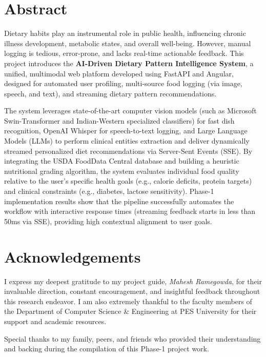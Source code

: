 \documentclass[12pt,a4paper,oneside]{report}
\begin{document}
\newpage
{}
\section*{Abstract}
Dietary habits play an instrumental role in public health, influencing chronic illness development, metabolic states, and overall well-being. However, manual logging is tedious, error-prone, and lacks real-time actionable feedback. This project introduces the \textbf{AI-Driven Dietary Pattern Intelligence System}, a unified, multimodal web platform developed using FastAPI and Angular, designed for automated user profiling, multi-source food logging (via image, speech, and text), and streaming dietary pattern recommendations. 

The system leverages state-of-the-art computer vision models (such as Microsoft Swin-Transformer and Indian-Western specialized classifiers) for fast dish recognition, OpenAI Whisper for speech-to-text logging, and Large Language Models (LLMs) to perform clinical entities extraction and deliver dynamically streamed personalized diet recommendations via Server-Sent Events (SSE). 
By integrating the USDA FoodData Central database and building a heuristic nutritional grading algorithm, the system evaluates individual food quality relative to the user's specific health goals (e.g., calorie deficits, protein targets) and clinical constraints (e.g., diabetes, lactose sensitivity). 
Phase-1 implementation results show that the pipeline successfully automates the workflow with interactive response times (streaming feedback starts in less than 50ms via SSE), providing high contextual alignment to user goals.

\newpage
\section*{Acknowledgements}
I express my deepest gratitude to my project guide, \textit{Mahesh Ramegowda}, for their invaluable direction, constant encouragement, and insightful feedback throughout this research endeavor. I am also extremely thankful to the faculty members of the Department of Computer Science \& Engineering at PES University for their support and academic resources.

Special thanks to my family, peers, and friends who provided their understanding and backing during the compilation of this Phase-1 project work.
\end{document}
